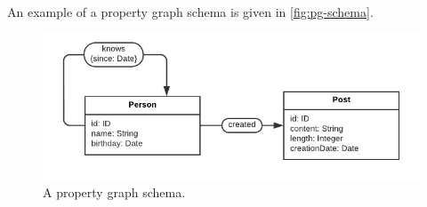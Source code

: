 \documentclass{article}
\begin{document}
An example of a property graph schema is given in \autoref{fig:pg-schema}.

\begin{figure}[t]
  \centering
  \includegraphics{figures/pg-schema.pdf}
  \caption{A property graph schema.}
  \label{fig:pg-schema}
\end{figure}
\end{document}
